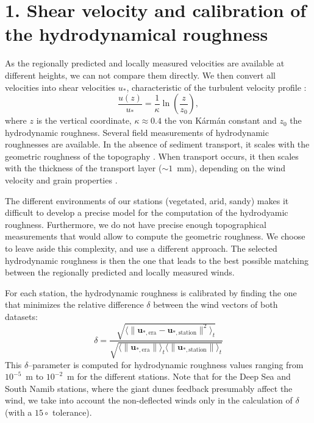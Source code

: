 \section*{1. Shear velocity and calibration of the hydrodynamical roughness}
\label{calib_z0}

As the regionally predicted and locally measured velocities are available at different heights, we can not compare them directly. We then convert all velocities into shear velocities $u_{*}$, characteristic of the turbulent velocity profile \citep{Spalding1961, Stull1988}:
\begin{equation}
  \frac{u(z)}{u_{*}} = \frac{1}{\kappa}\ln\left(\frac{z}{z_{0}}\right),
\end{equation}
where $z$ is the vertical coordinate, $\kappa \approx 0.4$ the von Kármán constant and $z_{0}$ the hydrodynamic roughness. Several field measurements of hydrodynamic roughnesses are available. In the absence of sediment transport, it scales with the geometric roughness of the topography \citep{Pelletier2016}. When transport occurs, it then scales with the thickness of the transport layer ($\sim 1$~mm), depending on the wind velocity and grain properties \citep{Sherman2008, Zhang2016, Field2018}.

The different environments of our stations (vegetated, arid, sandy) makes it difficult to develop a precise model for the computation of the hydrodyamic roughness. Furthermore, we do not have precise enough topographical measurements that would allow to compute the geometric roughness. We choose to leave aside this complexity, and use a different approach. The selected hydrodynamic roughness is then the one that leads to the best possible matching between the regionally predicted and locally measured winds.


For each station, the hydrodynamic roughness is calibrated by finding the one that minimizes the relative difference $\delta$ between the wind vectors of both datasets:
\begin{equation}
  \label{metric_roughness}
      \delta = \frac{\sqrt{\langle\| \boldsymbol{u}_{*, \textrm{era}} - \boldsymbol{u}_{*, \textrm{station}} \|^{2}\rangle_{t}}}{\sqrt{ \langle \| \boldsymbol{u}_{*, \textrm{era}} \| \rangle_{t}\langle \| \boldsymbol{u}_{*, \textrm{station}} \| \rangle_{t}}}
\end{equation}
This $\delta$--parameter is computed for hydrodynamic roughness values ranging from $10^{-5}$~m to $10^{-2}$~m for the different stations. Note that for the Deep Sea and South Namib stations, where the giant dunes feedback presumably affect the wind, we take into account the non-deflected winds only in the calculation of $\delta$ (with a $15\circ$ tolerance).


